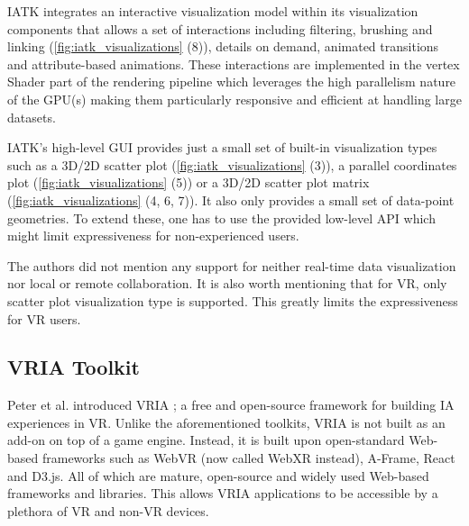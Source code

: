 \documentclass{vgtc}                          %
\begin{document}
\smallskip

\noindent IATK integrates an interactive visualization model within its
visualization components that allows a set of interactions including filtering,
brushing and linking (\autoref{fig:iatk_visualizations} (8)), details on demand,
animated transitions and attribute-based animations. These interactions are
implemented in the vertex Shader part of the rendering pipeline which leverages
the high parallelism nature of the GPU(s) making them particularly responsive
and efficient at handling large datasets.

\smallskip

\noindent IATK's high-level GUI provides just a small set of built-in visualization
types such as a 3D/2D scatter plot (\autoref{fig:iatk_visualizations}
(3)), a parallel coordinates plot (\autoref{fig:iatk_visualizations} (5)) or a
3D/2D scatter plot matrix (\autoref{fig:iatk_visualizations} (4, 6, 7)).
It also only provides a small set of data-point geometries. To extend these,
one has to use the provided low-level API which might limit expressiveness for
non-experienced users.

\smallskip

\noindent The authors did not mention any support for neither real-time data
visualization nor local or remote collaboration. It is also worth mentioning
that for VR, only scatter plot visualization type is supported. This greatly
limits the expressiveness for VR users.

\subsection{VRIA Toolkit}
Peter et al. introduced VRIA \cite{vria_framework}; a free and open-source \cite{vria:repo}
framework for building IA experiences in VR. Unlike the aforementioned
toolkits, VRIA is not built as an add-on on top of a game engine. Instead, it is
built upon open-standard Web-based frameworks such as WebVR (now called WebXR instead), A-Frame, React and
D3.js. All of which are mature, open-source and widely used Web-based
frameworks and libraries. This allows VRIA applications to be accessible by a
plethora of VR and non-VR devices.
\end{document}
